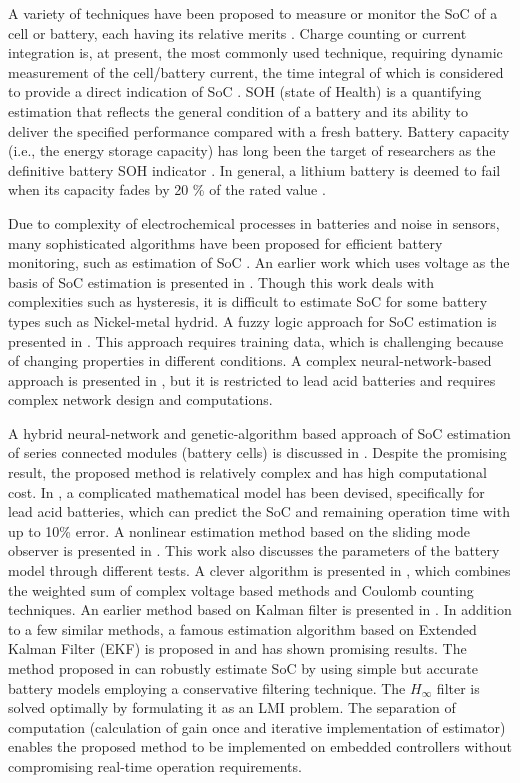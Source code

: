 A variety of techniques have been proposed to measure or
monitor the SoC of a cell or battery, each having its relative
merits \cite{ZS_pil}. Charge counting or current
integration is, at present, the most commonly used technique,
requiring dynamic measurement of the cell/battery current,
the time integral of which is considered to provide a direct
indication of SoC \cite{ZS_cau}. SOH (state of Health) is a quantifying estimation that reflects the general
condition of a battery and its ability to deliver the specified
performance compared with a fresh battery. Battery
capacity (i.e., the energy storage capacity) has long been the
target of researchers as the definitive battery SOH indicator \cite{ZS_yu}. In general, a lithium battery is deemed to fail when its capacity
fades by 20 \% of the rated value \cite{ZS_pas}.

 Due to complexity of electrochemical processes in batteries and noise in sensors, many sophisticated algorithms have been proposed for efficient battery monitoring, such as estimation of SoC \cite{ZS_cun}. An  earlier  work  which  uses  voltage  as  the  basis  of  SoC estimation is presented in \cite{ZS_ver}. Though this work deals with complexities  such  as  hysteresis,  it  is difficult to estimate SoC for some battery types such as Nickel-metal  hydrid.  A  fuzzy  logic  approach  for  SoC  estimation is  presented  in \cite{ZS_sin}. This approach  requires  training  data, which is  challenging  because  of  changing  properties  in  different conditions.  A  complex  neural-network-based  approach  is presented in \cite{ZS_ang}, but it is restricted to lead acid batteries and requires complex network design and computations. 
 
 A hybrid neural-network and genetic-algorithm based approach of SoC estimation  of  series  connected  modules  (battery  cells)  is discussed in \cite{ZS_11}. Despite the promising result, the proposed method is relatively complex and has high computational cost. In \cite{ZS_12}, a complicated mathematical model has been devised, specifically for lead acid batteries, which can predict the SoC and remaining operation time with up to 10\% error. A nonlinear estimation method based on the sliding mode observer is presented in \cite{ZS_13}. This work also discusses the parameters of the  battery  model  through  different  tests.  A  clever  algorithm is  presented  in \cite{ZS_14}, which  combines  the  weighted  sum  of complex  voltage  based  methods  and Coulomb  counting  techniques.  An  earlier  method  based  on Kalman  filter  is  presented  in \cite{ZS_15,ZS_16,ZS_17,ZS_18}.  In  addition  to  a few similar methods, a famous estimation algorithm based on Extended Kalman Filter (EKF) is proposed in \cite{ZS_19,ZS_20,ZS_21,ZS_22,ZS_23,ZS_24} and has shown promising results. The method proposed in \cite{ZS_shaheer} can robustly estimate SoC by using simple but accurate battery models employing a conservative filtering technique. The $H_\infty$ filter is  solved  optimally  by  formulating  it  as  an  LMI  problem. The separation of computation (calculation of gain once and iterative implementation of estimator) enables the proposed method to be implemented on embedded controllers without compromising real-time operation requirements.

